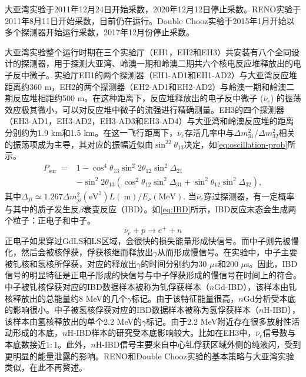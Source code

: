 \documentclass[a4paper,zihao=-4]{article}
\begin{document}
大亚湾实验于2011年12月24日开始采数，2020年12月12日停止采数。RENO实验于2011年8月11日开始采数，目前仍在运行。Double Chooz实验于2015年1月开始以多个探测器开始运行采数，2017年12月份停止采数。

大亚湾实验整个运行时期在三个实验厅（EH1，EH2和EH3）共安装有八个全同设计的探测器，用于探测大亚湾、岭澳一期和岭澳二期共六个核电反应堆释放出的电子反中微子。实验厅EH1的两个探测器（EH1-AD1和EH1-AD2）与大亚湾反应堆距离约360 m，EH2的两个探测器（EH2-AD1和EH2-AD2）与岭澳一期和岭澳二期反应堆相距约500 m。在这种距离下，反应堆释放出的电子反中微子 ($\overline{\nu}_e$) 的振荡效应极其微小，可以对反应堆中微子的流强进行精确测量。EH3的四个探测器（EH3-AD1，EH3-AD2，EH3-AD3和EH3-AD4）与大亚湾和岭澳反应堆的距离分别约为1.9 km和1.5 km。在这一飞行距离下，$\overline{\nu}_e$存活几率中与$\Delta m_{31}^2$/$\Delta m_{32}^2$相关的振荡项成为主导，其对应的振幅近似由$\sin^22\theta_{13}$决定，如\cref{eq:oscillation-prob}所示。
\begin{equation}\label{eq:oscillation-prob}
	\begin{aligned}
P_{\text {sur }}= & 1-\cos ^4 \theta_{13} \sin ^2 2 \theta_{12} \sin ^2 \Delta_{21} \\
& -\sin ^2 2 \theta_{13}\left(\cos ^2 \theta_{12} \sin ^2 \Delta_{31}+\sin ^2 \theta_{12} \sin ^2 \Delta_{32}\right),
\end{aligned}
\end{equation}
其中$\Delta_{j i} \simeq 1.267 \Delta m_{j i}^2\left(\mathrm{eV}^2\right) L(\mathrm{~m}) / E_\nu(\mathrm{MeV})$. 
当$\overline{\nu}_e$穿过探测器，有一定概率与其中的质子发生反$\beta$衰变反应（IBD）。如\cref{eq:IBD}所示，IBD反应末态会生成两个粒子：正电子和中子。
\begin{equation}\label{eq:IBD}
	\overline{\nu}_e+p\to e^++n
\end{equation}
正电子如果穿过GdLS和LS区域，会很快的损失能量形成快信号。而中子则先被慢化，然后会被核俘获，俘获核继而释放出$\gamma$从而形成慢信号。在实验中，中子主要被钆核和氢核所俘获，对应的释放出$\gamma$的时间分别约为30 $\mu$s和200 $\mu$s。因此，IBD信号的明显特征是正电子形成的快信号与中子俘获形成的慢信号在时间上的符合。中子被钆核俘获对应的IBD数据样本被称为钆俘获样本（$n$Gd-IBD），该样本由钆核释放出的总能量约8 MeV的几个$\gamma$标记。由于该特征能量很高，$n$Gd分析受本底的影响很小。中子被氢核俘获对应的IBD数据样本被称为氢俘获样本（$n$H-IBD），该样本由氢核释放出的单个2.2 MeV的$\gamma$标记。由于2.2 MeV附近存在很多放射性活动形成的本底，$n$H-IBD样本的研究受本底影响较大。比如在EH3中，$\overline{\nu}_e$信号数与本底数接近$1:1$。此外，$n$H-IBD信号主要来自中心钆俘获区域外侧的纯液闪，受到更明显的能量泄露的影响。RENO和Double Chooz实验的基本策略与大亚湾实验类似，在此不再赘述。
\end{document}
